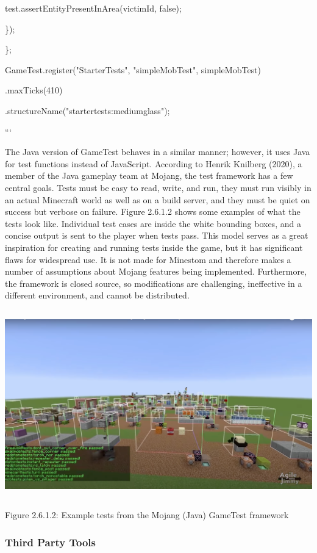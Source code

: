 \documentclass{article}
\begin{document}
\begin{onehalfspacing}
test.assertEntityPresentInArea(victimId, false);

\});

\};

GameTest.register("StarterTests", "simpleMobTest", simpleMobTest)

.maxTicks(410)

.structureName("startertests:mediumglass");

```

The Java version of GameTest behaves in a similar manner; however, it
uses Java for test functions instead of JavaScript. According to Henrik
Knilberg (2020), a member of the Java gameplay team at Mojang, the test
framework has a few central goals. Tests must be easy to read, write,
and run, they must run visibly in an actual Minecraft world as well as
on a build server, and they must be quiet on success but verbose on
failure. Figure 2.6.1.2 shows some examples of what the tests look like.
Individual test cases are inside the white bounding boxes, and a concise
output is sent to the player when tests pass. This model serves as a
great inspiration for creating and running tests inside the game, but it
has significant flaws for widespread use. It is not made for Minestom
and therefore makes a number of assumptions about Mojang features being
implemented. Furthermore, the framework is closed source, so
modifications are challenging, ineffective in a different environment,
and cannot be distributed.

\includegraphics[width=6.01042in,height=3.20833in]{media/media/image7.png}

Figure 2.6.1.2: Example tests from the Mojang (Java) GameTest framework

\subsubsection{Third Party Tools}


\end{onehalfspacing}
\end{document}
